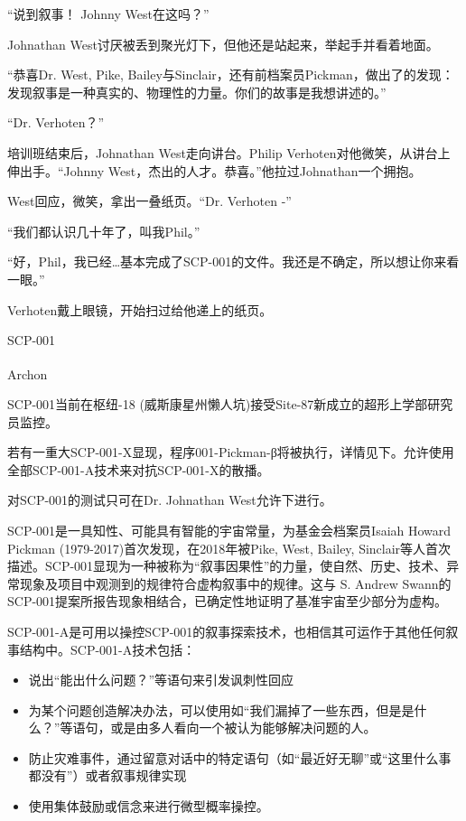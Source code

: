 “说到叙事！ Johnny West在这吗？”

Johnathan West讨厌被丢到聚光灯下，但他还是站起来，举起手并看着地面。

“恭喜Dr. West, Pike, Bailey与Sinclair，还有前档案员Pickman，做出了的发现：发现叙事是一种真实的、物理性的力量。你们的故事是我想讲述的。”

\hr

“Dr. Verhoten？”

培训班结束后，Johnathan West走向讲台。Philip Verhoten对他微笑，从讲台上伸出手。“Johnny West，杰出的人才。恭喜。”他拉过Johnathan一个拥抱。

West回应，微笑，拿出一叠纸页。“Dr. Verhoten -”

“我们都认识几十年了，叫我Phil。”

“好，Phil，我已经…基本完成了SCP-001的文件。我还是不确定，所以想让你来看一眼。”

Verhoten戴上眼镜，开始扫过给他递上的纸页。

\hr

SCP-001

Archon\textsuperscript{}

SCP-001当前在枢纽-18 (威斯康星州懒人坑)接受Site-87新成立的超形上学部研究员监控。

若有一重大SCP-001-X显现，程序001-Pickman-β将被执行，详情见下。允许使用全部SCP-001-A技术来对抗SCP-001-X的散播。

对SCP-001的测试只可在Dr. Johnathan West允许下进行。

SCP-001是一具知性、可能具有智能的宇宙常量，为基金会档案员Isaiah Howard Pickman (1979-2017)首次发现，在2018年被Pike, West, Bailey, Sinclair等人首次描述。SCP-001显现为一种被称为“叙事因果性”的力量，使自然、历史、技术、异常现象及项目中观测到的规律符合虚构叙事中的规律。这与 S. Andrew Swann的SCP-001提案所报告现象相结合，已确定性地证明了基准宇宙至少部分为虚构。

SCP-001-A是可用以操控SCP-001的叙事探索技术，也相信其可运作于其他任何叙事结构中。SCP-001-A技术包括：

\begin{itemize}
\item 说出“能出什么问题？”等语句来引发讽刺性回应
\item 为某个问题创造解决办法，可以使用如“我们漏掉了一些东西，但是是什么？”等语句，或是由多人看向一个被认为能够解决问题的人。
\item 防止灾难事件，通过留意对话中的特定语句（如“最近好无聊”或“这里什么事都没有”）或者叙事规律实现
\item 使用集体鼓励或信念来进行微型概率操控。
\end{itemize}

